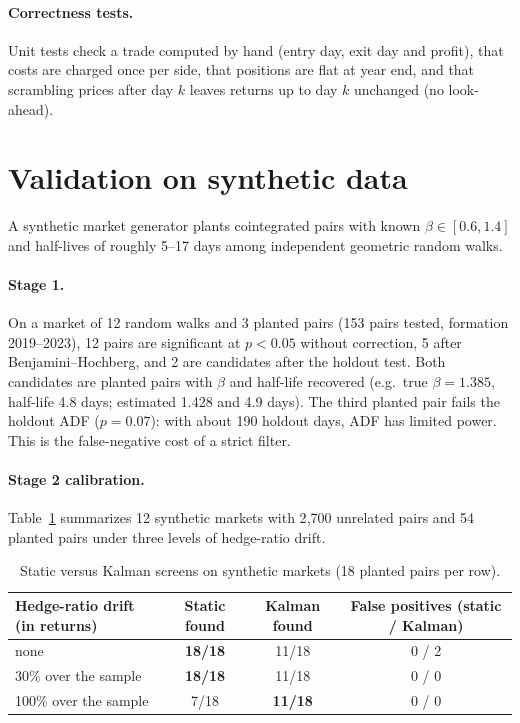 \documentclass[11pt]{article}
\begin{document}
\paragraph{Correctness tests.} Unit tests check a trade computed by hand (entry day, exit day
and profit), that costs are charged once per side, that positions are flat at year end, and
that scrambling prices after day $k$ leaves returns up to day $k$ unchanged (no look-ahead).

\section{Validation on synthetic data}

A synthetic market generator plants cointegrated pairs with known $\beta\in[0.6,1.4]$ and
half-lives of roughly 5--17 days among independent geometric random walks.

\paragraph{Stage 1.} On a market of 12 random walks and 3 planted pairs (153 pairs tested,
formation 2019--2023), 12 pairs are significant at $p<0.05$ without correction, 5 after
Benjamini--Hochberg, and 2 are candidates after the holdout test. Both candidates are planted
pairs with $\beta$ and half-life recovered (e.g.\ true $\beta=1.385$, half-life 4.8 days;
estimated 1.428 and 4.9 days). The third planted pair fails the holdout ADF ($p=0.07$): with
about 190 holdout days, ADF has limited power. This is the false-negative cost of a strict
filter.

\paragraph{Stage 2 calibration.} Table~\ref{tab:calib} summarizes 12 synthetic markets with
2{,}700 unrelated pairs and 54 planted pairs under three levels of hedge-ratio drift.

\begin{table}[ht]
\centering
\caption{Static versus Kalman screens on synthetic markets (18 planted pairs per row).}
\label{tab:calib}
\begin{tabular}{lccc}
\toprule
Hedge-ratio drift (in returns) & Static found & Kalman found & False positives (static / Kalman)\\
\midrule
none                    & \textbf{18/18} & 11/18 & 0 / 2\\
30\% over the sample    & \textbf{18/18} & 11/18 & 0 / 0\\
100\% over the sample   & 7/18           & \textbf{11/18} & 0 / 0\\
\bottomrule
\end{tabular}
\end{table}
\end{document}
